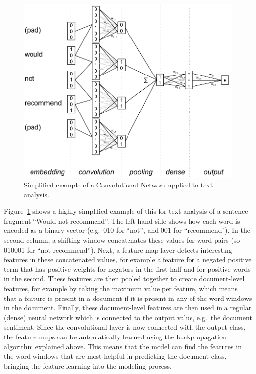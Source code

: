 \begin{figure}
  \centering\includegraphics[width=.8\linewidth]{figures/ch09_cnn_cropped.pdf}
  \caption{Simplified example of a Convolutional Network applied to text analysis.}
  \label{fig:cnn}
  \end{figure}

Figure~\ref{fig:cnn} shows a highly simplified example of this for text analysis of a sentence fragment ``Would not recommend''.
The left hand side shows how each word is encoded as a binary vector (e.g.\ 010 for ``not'', and 001 for ``recommend'').
In the second column, a shifting window concatenates these values for word pairs (so 010001 for ``not recommend'').
Next, a feature map layer detects interesting features in these concatenated values, for example
a feature for a negated positive term that has positive weights for negators in the first half and for positive words in the second.
These features are then pooled together to create document-level features,
for example by taking the maximum value per feature, which means that a feature is present in a document if it is present in any of the word windows in the document.
Finally, these document-level features are then used in a regular (dense) neural network which is connected to the output value, e.g.\ the document sentiment.
Since the convolutional layer is now connected with the output class, the feature maps can be automatically learned using the backpropagation algorithm explained above.
This means that the model can find the features in the word windows that are most helpful in predicting the document class, bringing the feature learning into the modeling process.

